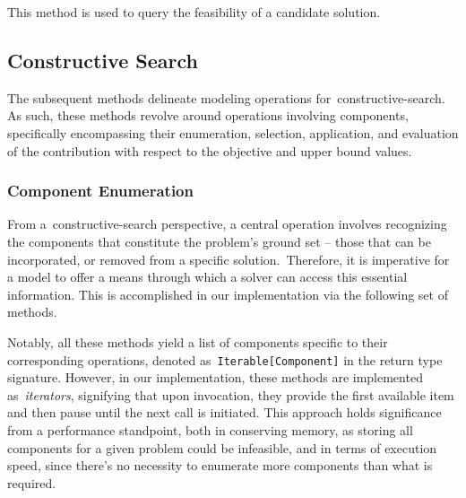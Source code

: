 \begin{center}
\end{center}

This method is used to query the feasibility of a candidate solution.

\subsection{Constructive Search}

The subsequent methods delineate modeling operations
for~\acrshort{constructive-search}. As such, these methods revolve around
operations involving components, specifically encompassing their enumeration,
selection, application, and evaluation of the contribution with respect to the
objective and upper bound values.

\subsubsection*{Component Enumeration}

From a~\acrshort{constructive-search} perspective, a central operation involves
recognizing the components that constitute the problem's ground set -- those
that can be incorporated, or removed from a specific solution.~Therefore, it is
imperative for a model to offer a means through which a solver can access this
essential information. This is accomplished in our implementation via the
following set of methods.

\begin{center}

\end{center}

Notably, all these methods yield a list of components specific to their
corresponding operations, denoted as~\texttt{Iterable[Component]} in the return
type signature. However, in our implementation, these methods are implemented
as~\emph{iterators}, signifying that upon invocation, they provide the first
available item and then pause until the next call is initiated. This approach
holds significance from a performance standpoint, both in conserving memory, as
storing all components for a given problem could be infeasible, and in terms of
execution speed, since there's no necessity to enumerate more components than
what is required.

